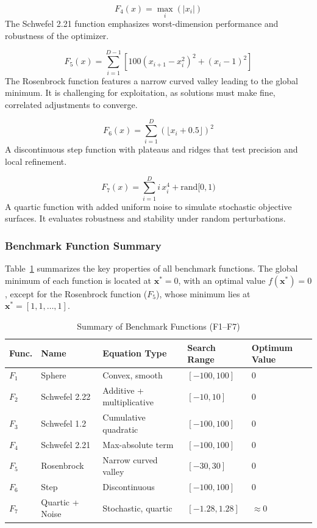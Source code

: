 \documentclass[a4paper,12pt]{article}
\begin{document}
\begin{equation}
F_4(x) = \max_{i} \left( |x_i| \right)
\end{equation}
The Schwefel 2.21 function emphasizes worst-dimension performance and robustness of the optimizer.

\begin{equation}
F_5(x) = \sum_{i=1}^{D-1} \left[ 100(x_{i+1} - x_i^2)^2 + (x_i - 1)^2 \right]
\end{equation}
The Rosenbrock function features a narrow curved valley leading to the global minimum.  
It is challenging for exploitation, as solutions must make fine, correlated adjustments to converge.

\begin{equation}
F_6(x) = \sum_{i=1}^{D} \left( \lfloor x_i + 0.5 \rfloor \right)^2
\end{equation}
A discontinuous step function with plateaus and ridges that test precision and local refinement.

\begin{equation}
F_7(x) = \sum_{i=1}^{D} i\,x_i^4 + \text{rand}[0,1)
\end{equation}
A quartic function with added uniform noise to simulate stochastic objective surfaces.  
It evaluates robustness and stability under random perturbations.

\bigskip

\subsubsection{Benchmark Function Summary}

Table~\ref{tab:benchmark} summarizes the key properties of all benchmark functions.  
The global minimum of each function is located at $\mathbf{x}^* = 0$, with an optimal value $f(\mathbf{x}^*) = 0$, except for the Rosenbrock function ($F_5$), whose minimum lies at $\mathbf{x}^* = [1,1,\dots,1]$.

\begin{table}[h!]
\centering
\caption{Summary of Benchmark Functions (F1--F7)}
\label{tab:benchmark}
\begin{tabular}{@{}lllll@{}}
\toprule
\textbf{Func.} & \textbf{Name} & \textbf{Equation Type} & \textbf{Search Range} & \textbf{Optimum Value} \\ \midrule
$F_1$ & Sphere & Convex, smooth & $[-100, 100]$ & 0 \\
$F_2$ & Schwefel 2.22 & Additive + multiplicative & $[-10, 10]$ & 0 \\
$F_3$ & Schwefel 1.2 & Cumulative quadratic & $[-100, 100]$ & 0 \\
$F_4$ & Schwefel 2.21 & Max-absolute term & $[-100, 100]$ & 0 \\
$F_5$ & Rosenbrock & Narrow curved valley & $[-30, 30]$ & 0 \\
$F_6$ & Step & Discontinuous & $[-100, 100]$ & 0 \\
$F_7$ & Quartic + Noise & Stochastic, quartic & $[-1.28, 1.28]$ & $\approx 0$ \\ \bottomrule
\end{tabular}
\end{table}
\end{document}
